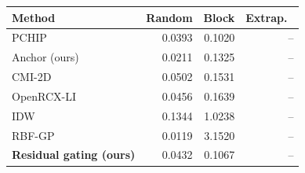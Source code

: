 \small
\begin{tabular}{lrrr}\toprule
Method & Random & Block & Extrap.\ \\\midrule
PCHIP & 0.0393 & 0.1020 & -- \\
Anchor (ours) & 0.0211 & 0.1325 & -- \\
CMI-2D & 0.0502 & 0.1531 & -- \\
OpenRCX-LI & 0.0456 & 0.1639 & -- \\
IDW & 0.1344 & 1.0238 & -- \\
RBF-GP & 0.0119 & 3.1520 & -- \\
\textbf{Residual gating (ours)} & 0.0432 & 0.1067 & -- \\
\bottomrule\end{tabular}
